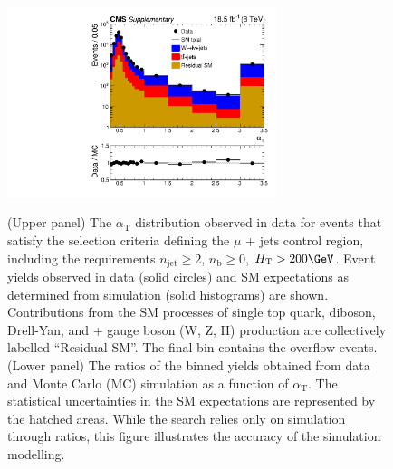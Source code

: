 \clearpage
\begin{figure}[h!]
  \begin{center}
    \includegraphics[width=0.7\textwidth]{AlphaT_CR} \\
    \caption{ (Upper panel) The $\alpha_\text{T}$ distribution
      observed in data for events that satisfy the selection criteria
      defining the $\mu$ + jets control region, including the
      requirements $n_\text{jet} \geq 2$, $n_\text{b} \geq 0$,
      $H_\text{T} > 200\GeV$. Event yields observed in data (solid
      circles) and SM expectations as determined from simulation
      (solid histograms) are shown. Contributions from the SM
      processes of single top quark, diboson, Drell-Yan, and \ttbar +
      gauge boson (W, Z, H) production are collectively labelled
      ``Residual SM''. The final bin contains the overflow events.
      (Lower panel) The ratios of the binned yields obtained from data
      and Monte Carlo (MC) simulation as a function of
      $\alpha_\text{T}$. The statistical uncertainties in the SM
      expectations are represented by the hatched areas. While the
      search relies only on simulation through ratios, this figure
      illustrates the accuracy of the simulation modelling. }
  \end{center}
\end{figure}

